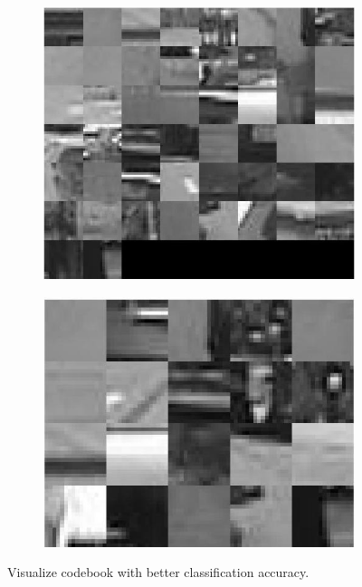 \documentclass{ethz_report}
\begin{document}
\begin{figure}[h]
    \centering
    \begin{subfigure}[b]{.5\textwidth}
        \centering
        \includegraphics[width=1\linewidth]{images/visualize_codebook_50}
    \end{subfigure}%
    \begin{subfigure}[b]{.5\textwidth}
        \centering
        \includegraphics[width=1\linewidth]{images/visualize_codebook_20}
    \end{subfigure}
    \caption{Visualize codebook with better classification accuracy.}
    \label{fig:visualize_codebook_best}
\end{figure}
\end{document}
